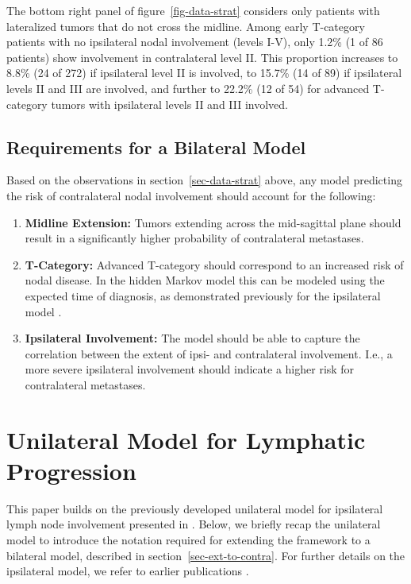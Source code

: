 \documentclass[
  sn-mathphys-num,
]{sn-jnl}
\providecommand{\tightlist}{%
  \setlength{\itemsep}{0pt}\setlength{\parskip}{0pt}}\usepackage{longtable,booktabs,array}
\begin{document}
The bottom right panel of figure~\ref{fig-data-strat} considers only
patients with lateralized tumors that do not cross the midline. Among
early T-category patients with no ipsilateral nodal involvement (levels
I-V), only 1.2\% (1 of 86 patients) show involvement in contralateral
level II. This proportion increases to 8.8\% (24 of 272) if ipsilateral
level II is involved, to 15.7\% (14 of 89) if ipsilateral levels II and
III are involved, and further to 22.2\% (12 of 54) for advanced
T-category tumors with ipsilateral levels II and III involved.

\subsection{Requirements for a Bilateral Model}\label{sec-requirements}

Based on the observations in section~\ref{sec-data-strat} above, any
model predicting the risk of contralateral nodal involvement should
account for the following:

\begin{enumerate}
\def\labelenumi{\arabic{enumi}.}
\tightlist
\item
  \textbf{Midline Extension:} Tumors extending across the mid-sagittal
  plane should result in a significantly higher probability of
  contralateral metastases.
\item
  \textbf{T-Category:} Advanced T-category should correspond to an
  increased risk of nodal disease. In the hidden Markov model this can
  be modeled using the expected time of diagnosis, as demonstrated
  previously for the ipsilateral model \citep{ludwig_hidden_2021}.
\item
  \textbf{Ipsilateral Involvement:} The model should be able to capture
  the correlation between the extent of ipsi- and contralateral
  involvement. I.e., a more severe ipsilateral involvement should
  indicate a higher risk for contralateral metastases.
\end{enumerate}

\section{Unilateral Model for Lymphatic
Progression}\label{sec-unilateral}

This paper builds on the previously developed unilateral model for
ipsilateral lymph node involvement presented in
\citep{ludwig_modelling_2024}. Below, we briefly recap the unilateral
model to introduce the notation required for extending the framework to
a bilateral model, described in section~\ref{sec-ext-to-contra}. For
further details on the ipsilateral model, we refer to earlier
publications \citep{ludwig_hidden_2021, ludwig_modelling_2024}.
\end{document}
